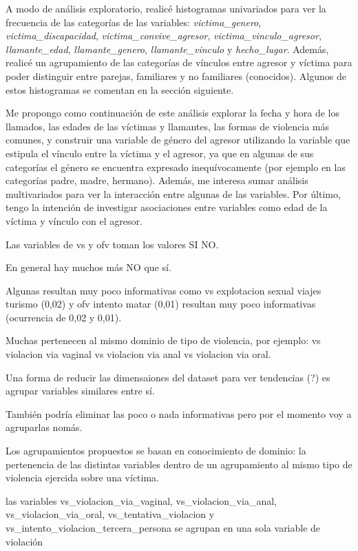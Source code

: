 \documentclass[10pt, spanish]{article}
\begin{document}
A modo de análisis exploratorio, realicé histogramas univariados para ver la frecuencia de las categorías de las variables: \textit{victima\_genero}, \textit{victima\_discapacidad}, \textit{victima\_convive\_agresor}, \textit{victima\_vinculo\_agresor}, \textit{llamante\_edad}, \textit{llamante\_genero}, \textit{llamante\_vinculo} y \textit{hecho\_lugar}. Además, realicé un agrupamiento de las categorías de vínculos entre agresor y víctima para poder distinguir entre parejas, familiares y no familiares (conocidos). Algunos de estos histogramas se comentan en la sección siguiente. 

Me propongo como continuación de este análisis explorar la fecha y hora de los llamados, las edades de las víctimas y llamantes, las formas de violencia más comunes, y construir una variable de género del agresor utilizando la variable que estipula el vínculo entre la víctima y el agresor, ya que en algunas de sus categorías el género se encuentra expresado inequívocamente (por ejemplo en las categorías padre, madre, hermano). Además, me interesa sumar análisis multivariados para ver la interacción entre algunas de las variables. Por último, tengo la intención de investigar asociaciones entre variables como edad de la víctima y vínculo con el agresor.



Las variables de vs y ofv toman los valores SI NO.

En general hay muchos más NO que sí.

Algunas resultan muy poco informativas como vs explotacion sexual viajes turismo (0,02) y ofv intento matar (0,01) resultan muy poco informativas (ocurrencia de 0,02 y 0,01).

Muchas pertenecen al mismo dominio de tipo de violencia, por ejemplo: vs violacion via vaginal vs violacion via anal vs violacion via oral.

Una forma de reducir las dimensaiones del dataset para ver tendencias (?)  es agrupar variables similares entre sí.

También podría eliminar las poco o nada informativas pero por el momento voy a agruparlas nomás.

Los agrupamientos propuestos se basan en conocimiento de dominio: la pertenencia de las distintas variables dentro de un agrupamiento al mismo tipo de violencia ejercida sobre una víctima.




las variables vs\_violacion\_via\_vaginal,  vs\_violacion\_via\_anal,  vs\_violacion\_via\_oral, vs\_tentativa\_violacion y vs\_intento\_violacion\_tercera\_persona se agrupan en una sola variable de violación
\end{document}
